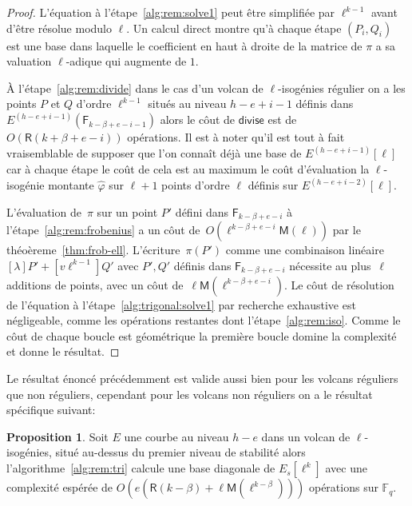 \documentclass[10pt,a4paper]{book}
\theoremstyle{plain}
\theoremstyle{definition}
\theoremstyle{definition}
\theoremstyle{definition}
\newtheorem{prop}[thm]{Proposition}
\theoremstyle{definition}
\theoremstyle{remark}
\theoremstyle{remark}
\theoremstyle{definition}
\begin{document}
\begin{proof}
L'équation à l'étape~\ref{alg:rem:solve1} peut être simplifiée par $\ell^{k-1}$ avant d'être résolue modulo $\ell$. Un calcul direct montre qu'à chaque étape $(P_i,Q_i)$ est une base dans laquelle le coefficient en haut à droite de la matrice de $\pi$ a sa valuation $\ell$-adique qui augmente de $1$. 


\`A l'étape~\ref{alg:rem:divide} dans le cas d'un volcan de $\ell$-isogénies 
régulier on a les points $P$ et $Q$ d'ordre $\ell^{k-1}$ situés au niveau $h-e+i-1$
 définis dans $E^{(h-e+i-1)}(\mathsf{F}_{k-\beta+e-i-1})$ alors le côut de $\mathsf{divise}$
 est de $O(\mathsf{R}(k+\beta+e-i))$ opérations.
 Il est à noter qu'il est tout à fait vraisemblable de supposer que l'on 
 connaît déjà une base de $E^{(h-e+i-1)}[\ell]$ car à chaque étape le coût de cela
 est au maximum le coût d'évaluation la $\ell$-isogénie montante 
 $\widehat{\varphi}$ sur $\ell+1$ points d'ordre $\ell$ définis sur 
 $E^{(h-e+i-2)}[\ell]$.

  L'évaluation de~$\pi$ sur un point $P'$ défini dans 
  $\mathsf{F}_{k-\beta+e-i}$  à l'étape~\ref{alg:rem:frobenius} a un côut
  de~$O(\ell^{k-\beta+e-i}\mathsf{M}(\ell))$ par le théoèreme~\ref{thm:frob-ell}.
  L'écriture~$\pi(P')$ comme une combinaison linéaire~$[\lambda] P' + [v\ell^{k-1}] Q'$ 
  avec $P',Q'$ définis dans $\mathsf{F}_{k-\beta+e-i}$  nécessite au plus~$\ell$
  additions de points, avec un côut de~$\ell \mathsf{M}(\ell^{k-\beta+e-i})$.
  Le côut de résolution de l'équation à l'étape~\ref{alg:trigonal:solve1}
  par recherche exhaustive est négligeable, comme les 
  opérations restantes dont l'étape~\ref{alg:rem:iso}.
  Comme le côut de chaque boucle est géométrique
  la première boucle domine la complexité et donne le résultat.
\end{proof}

Le résultat énoncé précédemment est valide aussi bien pour les volcans réguliers que non réguliers, cependant pour les volcans non réguliers on a le résultat spécifique suivant:

\begin{prop}
Soit $E$ une courbe au niveau $h-e$ dans un volcan de $\ell$-isogénies, situé au-dessus du premier niveau de stabilité alors l'algorithme~\ref{alg:rem:tri} calcule une base diagonale de $E_s[\ell^k]$ avec une complexité espérée de $O(e( \mathsf{R}(k-\beta) + \ell\mathsf{M}(\ell^{k-\beta})))$ opérations sur $\mathbb{F}_q$.
\end{prop}
\end{document}

